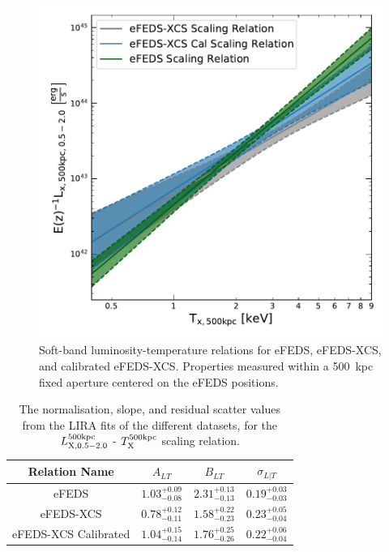 \documentclass[fleqn,usenatbib]{mnras}
\begin{document}
\begin{figure}
    \centering
    \includegraphics[width=1\columnwidth]{images/efeds_lt52.pdf}
    \caption[]{Soft-band luminosity-temperature relations for eFEDS, eFEDS-XCS, and calibrated eFEDS-XCS. Properties measured within a 500~kpc fixed aperture centered on the eFEDS positions.}
    \label{fig:prelimlt}
\end{figure}

\begin{table}
\begin{center}
\caption[]{{\small The normalisation, slope, and residual scatter values from the LIRA fits of the different datasets, for the $L^{500\rm{kpc}}_{\rm{X, 0.5-2.0}}$ - $T_{\rm{X}}^{500\rm{kpc}}$ scaling relation.}\label{tab:relations}}
\vspace{1mm}
\begin{tabular}{cccc}
\hline
\hline
Relation Name & $A_{LT}$ & $B_{LT}$ & $\sigma_{L|T}$\\
\hline
\hline
eFEDS & $1.03^{+0.09}_{-0.08}$ & $2.31^{+0.13}_{-0.13}$ & $0.19^{+0.03}_{-0.03}$\\
\hline 
eFEDS-XCS & $0.78^{+0.12}_{-0.11}$ & $1.58^{+0.22}_{-0.23}$ & $0.23^{+0.05}_{-0.04}$\\
\hline 
eFEDS-XCS Calibrated & $1.04^{+0.15}_{-0.14}$ & $1.76^{+0.25}_{-0.26}$ & $0.22^{+0.06}_{-0.04}$\\
\hline
\end{tabular}
\end{center}
\end{table}
\end{document}
